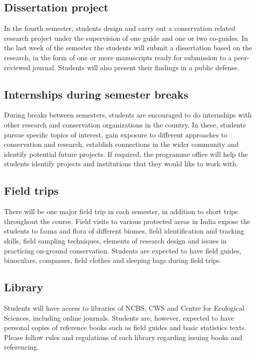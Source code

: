\documentclass[a4paper,10pt]{article}
\begin{document}
\subsection{Dissertation project}
In the fourth semester, students design and carry out a conservation
related research project under the supervision of one guide and one or two co-guides. In the
last week of the semester the students will submit a dissertation based on the research, in the
form of one or more manuscripts ready for submission to a peer-reviewed journal. Students
will also present their findings in a public defense.

\subsection{Internships during semester breaks}
During breaks between semesters, students are
encouraged to do internships with other research and conservation organizations in the
country. In these, students pursue specific topics of interest, gain exposure to different
approaches to conservation and research, establish connections in the wider community and
identify potential future projects. If required, the programme office will help the students
identify projects and institutions that they would like to work with.

\subsection{Field trips} There will be one major field trip in each semester, in addition to short trips
throughout the course. Field visits to various protected areas in India expose the students to
fauna and flora of different biomes, field identification and tracking skills, field sampling
techniques, elements of research design and issues in practicing on-ground conservation.
Students are expected to have field guides, binoculars, compasses, field clothes and sleeping
bags during field trips.

	
\subsection{Library}
Students will have access to libraries of NCBS, CWS and Centre for Ecological
Sciences, including online journals. Students are, however, expected to have personal copies
of reference books such as field guides and basic statistics texts. Please follow rules and
regulations of each library regarding issuing books and referencing.
\end{document}
